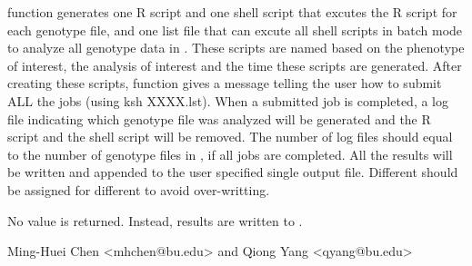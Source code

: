 \begin{Details}\relax
{} function generates one R script and one shell script that excutes the R script for each genotype file, and one list file 
that can excute all shell scripts in batch mode to analyze all genotype data in . These scripts are named based on the phenotype of interest,
the analysis of interest and the time these scripts are generated. After creating these scripts,  
function gives a message telling the user how to submit ALL the jobs (using ksh XXXX.lst). When a submitted job
is completed, a log file indicating which genotype file was analyzed will be generated and the R script and the 
shell script will be removed. The number of log files should equal to the number of genotype files in , if all jobs 
are completed. All the results will be written and appended to the user specified single output file. Different
 should be assigned for different  to avoid over-writting.
\end{Details}
\begin{Value}
No value is returned. Instead, results are written to .
\end{Value}
\begin{Author}\relax
Ming-Huei Chen <mhchen@bu.edu> and Qiong Yang <qyang@bu.edu>
\end{Author}

